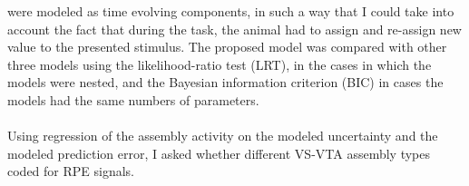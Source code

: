 were modeled as time evolving components, in such a way that I could take into account the fact that during the task, the animal had to assign and re-assign new value to the presented stimulus. The proposed model was compared with other three models using the likelihood-ratio test (LRT), in the cases in which the models were nested, and the Bayesian information criterion (BIC) in cases the models had the same numbers of parameters.\\\\
Using regression of the assembly activity on the modeled uncertainty and the modeled prediction error, I asked whether different VS-VTA assembly types coded for RPE signals.


